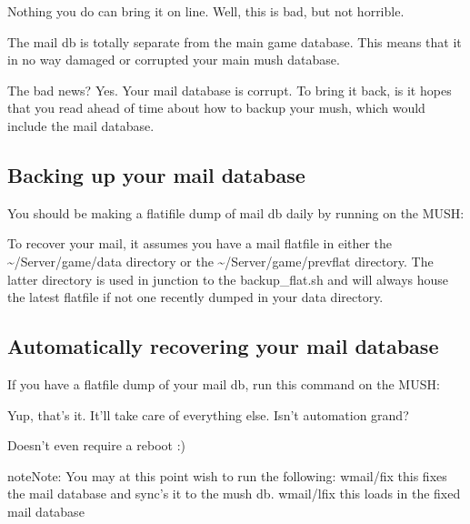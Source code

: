 \documentclass[letterpaper,10pt,english]{sphinxmanual}
\begin{document}
\sphinxAtStartPar
Nothing you do can bring it on line.  Well, this is bad, but not horrible.

\sphinxAtStartPar
The mail db is totally separate from the main game database.  This means
that it in no way damaged or corrupted your main mush database.

\sphinxAtStartPar
The bad news?  Yes.  Your mail database is corrupt.  To bring it back,
is it hopes that you read ahead of time about how to backup your mush,
which would include the mail database.


\subsection{Backing up your mail database}
\label{\detokenize{troubleshooting:backing-up-your-mail-database}}
\sphinxAtStartPar
You should be making a flatifile dump of mail db daily by running on the MUSH:

\begin{sphinxVerbatim}[commandchars=\\\{\}]
\end{sphinxVerbatim}

\sphinxAtStartPar
To recover your mail, it assumes you have a mail flatfile in either the
\textasciitilde{}/Server/game/data directory or the \textasciitilde{}/Server/game/prevflat directory.  The
latter directory is used in junction to the backup\_flat.sh and will always
house the latest flatfile if not one recently dumped in your data directory.


\subsection{Automatically recovering your mail database}
\label{\detokenize{troubleshooting:automatically-recovering-your-mail-database}}
\sphinxAtStartPar
If you have a flatfile dump of your mail db, run this command on the MUSH:

\begin{sphinxVerbatim}[commandchars=\\\{\}]
\end{sphinxVerbatim}

\sphinxAtStartPar
Yup, that’s it.  It’ll take care of everything else.  Isn’t automation grand?

\sphinxAtStartPar
Doesn’t even require a reboot :)

\begin{sphinxadmonition}{note}{Note:}
\sphinxAtStartPar
You may at this point wish to run the following:
wmail/fix  \textendash{} this fixes the mail database and sync’s it to the mush db.
wmail/lfix \textendash{} this loads in the fixed mail database
\end{sphinxadmonition}
\end{document}
